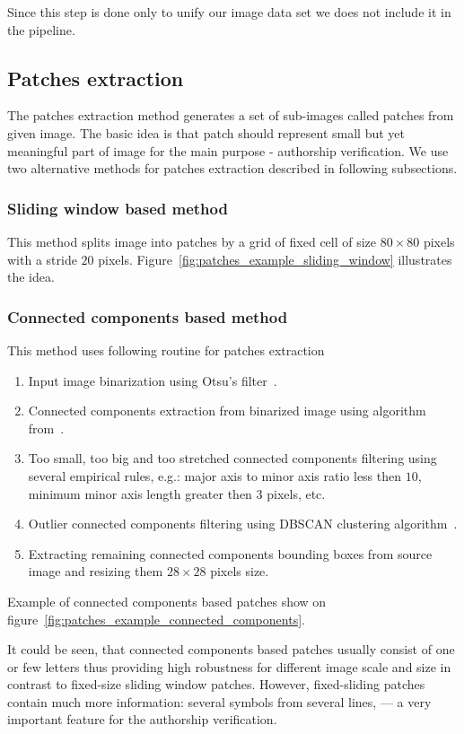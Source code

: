 \documentclass[conference,a4paper,twocolumn]{IEEEtran}
\begin{document}
Since this step is done only to unify our image data set we does not include it in the pipeline.

\subsection{Patches extraction}
The patches extraction method generates a set of sub-images called patches from given image. The basic idea is that patch should represent small but yet meaningful part of image for the main purpose - authorship verification. We use two alternative methods for patches extraction described in following subsections.

\subsubsection{Sliding window based method}
This method splits image into patches by a grid of fixed cell of size $80\times 80$ pixels with a stride $20$ pixels. Figure~\ref{fig:patches_example_sliding_window} illustrates the idea. 

\subsubsection{Connected components based method}
This method uses following routine for patches extraction

\begin{enumerate}
	\item Input image binarization using Otsu's filter~\cite{otsu1975threshold}.
	\item Connected components extraction from binarized image using algorithm from~\cite{fiorio1996connected_components}.
	\item Too small, too big and too stretched connected components filtering using several empirical rules, e.g.: major axis to minor axis ratio less then $10$, minimum minor axis length greater then $3$ pixels, etc.
	\item Outlier connected components filtering using DBSCAN clustering algorithm~\cite{ester1996dbscan}.
	\item Extracting remaining connected components bounding boxes from source image and resizing them $28\times 28$ pixels size.
\end{enumerate}

Example of connected components based patches show on figure~\ref{fig:patches_example_connected_components}. 

It could be seen, that connected components based patches usually consist of one or few letters thus providing high robustness for different image scale and size in contrast to fixed-size sliding window patches. However, fixed-sliding patches contain much more information: several symbols from several lines, --- a very important feature for the authorship verification.
%
\end{document}
